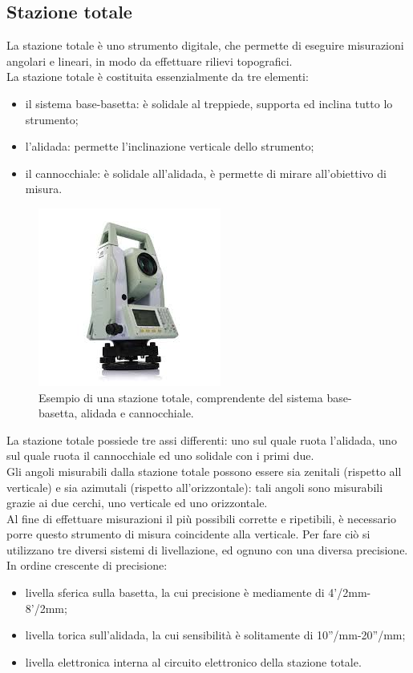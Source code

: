 \subsection{Stazione totale}
La stazione totale è uno strumento digitale, che permette di eseguire misurazioni angolari e lineari, in modo da effettuare rilievi topografici.\\
La stazione totale è costituita essenzialmente da tre elementi:
\begin{itemize}
    \item il sistema base-basetta: è solidale al treppiede, supporta ed inclina tutto lo strumento;
    \item l'alidada: permette l'inclinazione verticale dello strumento;
    \item il cannocchiale: è solidale all'alidada, è permette di mirare all'obiettivo di misura.
\end{itemize}
\begin{figure}[H]
    \centering
    \includegraphics[width=0.4 \textwidth]{immagini/stazione_totale.jpg}
    \caption{Esempio di una stazione totale, comprendente del sistema base-basetta, alidada e cannocchiale.}
    \label{fig:stazione_totale}
\end{figure}
La stazione totale possiede tre assi differenti: uno sul quale ruota l'alidada, uno sul quale ruota il cannocchiale ed uno solidale con i primi due.\\
Gli angoli misurabili dalla stazione totale possono essere sia zenitali (rispetto all verticale) e sia azimutali (rispetto all'orizzontale): tali angoli sono misurabili grazie ai due cerchi, uno verticale ed uno orizzontale.\\
Al fine di effettuare misurazioni il più possibili corrette e ripetibili, è necessario porre questo strumento di misura coincidente alla verticale. Per fare ciò si utilizzano tre diversi sistemi di livellazione, ed ognuno con una diversa precisione. In ordine crescente di precisione:
\begin{itemize}
    \item livella sferica sulla basetta, la cui precisione è mediamente di 4'/2mm-8'/2mm;
    \item livella torica sull'alidada, la cui sensibilità è solitamente di 10''/mm-20''/mm;
    \item livella elettronica interna al circuito elettronico della stazione totale.
\end{itemize}
